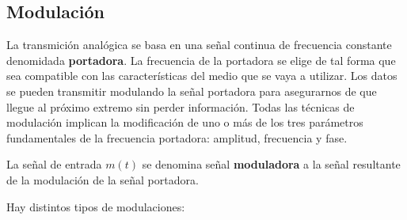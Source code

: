 \subsection{Modulación}
La transmición analógica se basa en una señal continua de frecuencia constante  denomidada \textbf{portadora}. La frecuencia de la portadora se elige de tal forma que sea compatible con las características del medio que se vaya a utilizar. Los datos se pueden transmitir modulando la señal portadora para asegurarnos de que llegue al próximo extremo sin perder información. Todas las técnicas de modulación implican la modificación de uno o más de los tres parámetros fundamentales de la frecuencia portadora: amplitud, frecuencia y fase.

La señal de entrada \(m(t)\) se denomina señal \textbf{moduladora} a la señal resultante de la modulación de la señal portadora.

Hay distintos tipos de modulaciones:

